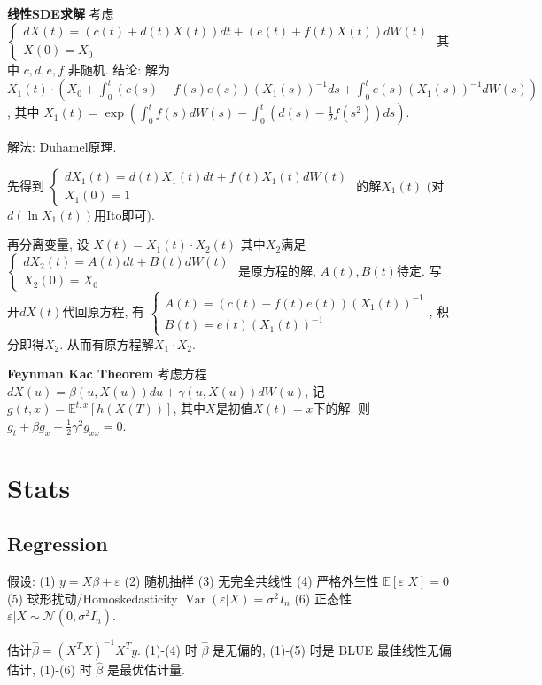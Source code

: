 \documentclass[UTF8]{ctexart}
\begin{document}
\textbf{线性SDE求解}  考虑$\left\{\begin{array}{l}
		d X(t)=(c(t)+d(t) X(t)) d t+(e(t)+f(t) X(t)) d W(t) \\
		X(0)=X_0\end{array}\right. $
其中 $c,d,e,f$ 非随机.
结论: 解为 $X_1(t) \cdot\left(X_0+\int_0^t(c(s)-f(s) e(s))\left(X_1(s)\right)^{-1} d s
	+\int_0^t e(s) \left(X_1(s)\right)^{-1} d W(s)\right)$,
其中 $X_1(t)=\exp \left(\int_0^t f(s) d W(s)-\int_0^t (d(s)-\frac{1}{2} f(s^2)) d s\right)$.

解法: Duhamel原理.

先得到 $\left\{\begin{array}{l}d X_1(t)=d(t) X_1(t) d t+f(t) X_1(t) d W(t) \\ X_1(0)=1\end{array}\right.$
的解$X_1(t)$ (对$d\left(\ln X_1(t)\right)$用Ito即可).

再分离变量, 设 $X(t)=X_1(t) \cdot X_2(t)$ 其中$X_2$满足 $\left\{\begin{array}{l}d X_2(t)=A(t) d t+B(t) d W(t) \\ X_2(0)=X_0\end{array}\right.$
是原方程的解, $A(t),B(t)$待定.
写开$dX(t)$代回原方程, 有
$\left\{\begin{array}{l}
		A(t)=(c(t)-f(t) e(t))\left(X_1(t)\right)^{-1} \\
		B(t)=e(t)\left(X_1(t)\right)^{-1}
	\end{array}\right.$, 积分即得$X_2$. 从而有原方程解$X_1\cdot X_2$.

\textbf{Feynman Kac Theorem}
考虑方程 $dX(u)=\beta(u,X(u))du+\gamma(u,X(u))dW(u)$,
记$g(t,x)=\mathbb{E}^{t,x}[h(X(T))]$, 其中$X$是初值$X(t)=x$下的解.
则$g_t+\beta g_x+\frac12 \gamma^2 g_{xx}=0$.

\section{Stats}

\subsection{Regression}

假设: (1) $y=X\beta+\varepsilon$ (2) 随机抽样 (3) 无完全共线性
(4) 严格外生性 $\mathbb{E}[\varepsilon|X]=0$ 
(5) 球形扰动/Homoskedasticity $\operatorname{Var}(\varepsilon|X)=\sigma^2 I_n$
(6) 正态性 $\varepsilon|X\sim\mathcal{N}(0,\sigma^2 I_n)$.

估计$\hat{\beta}=(X^TX)^{-1}X^Ty$.
(1)-(4) 时 $\hat{\beta}$ 是无偏的,
(1)-(5) 时是 BLUE 最佳线性无偏估计, (1)-(6) 时 $\hat{\beta}$ 是最优估计量.
\end{document}
